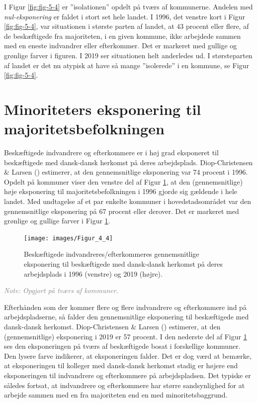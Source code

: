 \documentclass[
]{book}
\begin{document}
I Figur \ref{fig:fig-5-4} er ''isolationen'' opdelt på tværs af kommunerne. Andelen med \emph{nul-eksponering} er faldet i stort set hele landet. I 1996, det venstre kort i Figur \ref{fig:fig-5-4}, var situationen i største parten af landet, at \(43\) procent eller flere, af de beskæftigede fra majoriteten, i en given kommune, ikke arbejdede sammen med en eneste indvandrer eller efterkommer. Det er markeret med gullige og grønlige farver i figuren. I 2019 ser situationen helt anderledes ud. I størsteparten af landet er det nu atypisk at have så mange ''isolerede'' i en kommune, se Figur \ref{fig:fig-5-4}.

\section{Minoriteters eksponering til majoritetsbefolkningen}\label{minoriteters-eksponering-til-majoritetsbefolkningen}

Beskæftigede indvandrere og efterkommere er i høj grad eksponeret til beskæftigede med dansk-dansk herkomst på deres arbejdsplads. Diop-Christensen \& Larsen () estimerer, at den gennemsnitlige eksponering var 74 procent i 1996. Opdelt på kommuner viser den venstre del af Figur \ref{fig:fig-5-5}, at den (gennemsnitlige) høje eksponering til majoritetsbefolkningen i 1996 gjorde sig gældende i hele landet. Med undtagelse af et par enkelte kommuner i hovedstadsområdet var den gennemsnitlige eksponering på 67 procent eller derover. Det er markeret med grønlige og gullige farver i Figur \ref{fig:fig-5-5}.

\begin{figure}
\texttt{[image: images/Figur\_4\_4]} \caption{Beskæftigede indvandreres/efterkommeres gennemsnitlige eksponering til beskæftigede med dansk-dansk herkomst på deres arbejdsplads i 1996 (venstre) og 2019 (højre).}\label{fig:fig-5-5}
\end{figure}

\begin{footnotesize}\textit{\textcolor{gray}{
Note: Opgjort på tværs af kommuner.
}}
\end{footnotesize}

Efterhånden som der kommer flere og flere indvandrere og efterkommere ind på arbejdspladserne, så falder den gennemsnitlige eksponering til beskæftigede med dansk-dansk herkomst. Diop-Christensen \& Larsen () estimerer, at den (gennemsnitlige) eksponering i 2019 er 57 procent. I den nederste del af Figur \ref{fig:fig-5-5} ses den eksponeringen på tværs af beskæftigede bosat i forskellige kommuner. Den lysere farve indikerer, at eksponeringen falder. Det er dog værd at bemærke, at eksponeringen til kolleger med dansk-dansk herkomst stadig er højere end eksponeringen til indvandrere og efterkommere på arbejdspladsen. Det typiske er således fortsat, at indvandrere og efterkommere har større sandsynlighed for at arbejde sammen med en fra majoriteten end en med minoritetsbaggrund.
\end{document}
